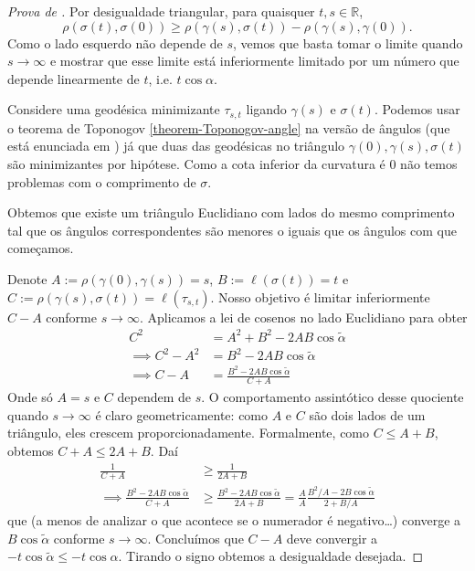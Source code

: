 \begin{proof}[Prova de \cite{Cheeger-Ebin}]
Por desigualdade triangular, para quaisquer $t,s \in \mathbb{R}$,
$$
\rho(\sigma(t),\sigma(0)) \geq
\rho(\gamma(s),\sigma(t))-\rho(\gamma(s),\gamma(0)).
$$
Como o lado esquerdo não depende de $s$, vemos que basta tomar o limite quando 
$s\to \infty$ e mostrar que esse limite está inferiormente limitado por um
número que depende linearmente de $t$, i.e. $t \cos\alpha$.

Considere uma geodésica minimizante $\tau_{s,t}$ ligando $\gamma(s)$ e
$\sigma(t)$. Podemos usar o teorema de Toponogov \ref{theorem-Toponogov-angle}
na versão de ângulos (que está enunciada em \cite{Cheeger-Ebin}) já que duas das
geodésicas no triângulo $\gamma(0),\gamma(s),\sigma(t)$ são minimizantes por
hipótese. Como a cota inferior da curvatura é 0 não temos problemas com o
comprimento de $\sigma$.

Obtemos que existe um triângulo Euclidiano com lados do mesmo comprimento tal
que os ângulos correspondentes são menores o iguais que os ângulos com que
começamos.

Denote $A:=\rho(\gamma(0),\gamma(s))=s$, $B:=\ell(\sigma(t))=t$ e
 $C:=\rho(\gamma(s),\sigma(t))=\ell(\tau_{s,t})$.
Nosso objetivo é limitar inferiormente $C-A$ conforme  $s \to \infty$.
 Aplicamos a lei de cosenos no lado Euclidiano para obter
\begin{align*}
C^2&=A^2+B^2-2AB\cos\tilde{\alpha}\\
\implies C^2-A^2&=B^2-2AB\cos\tilde{\alpha}\\
\implies C-A&=\frac{B^2-2AB\cos\tilde{\alpha}}{C+A}
\end{align*}
Onde só $A=s$ e $C$ dependem de $s$. O comportamento assintótico desse quociente
quando $s \to \infty$ é claro geometricamente: como $A$ e $C$ são dois lados de
um triângulo, eles crescem proporcionadamente. Formalmente, como $C \leq A+B$,
obtemos $C+A \leq 2A+B$. Daí
\begin{align*}
\frac{1}{C+A}&\geq \frac{1}{2A+B}\\
\implies \frac{B^2-2AB\cos \tilde{\alpha}}{C+A}&\geq
 \frac{B^2-2AB \cos \tilde{\alpha}}{2A+B}
=\frac{A}{A}\frac{B^2/A-2B\cos \tilde{\alpha}}{2+B/A}
\end{align*}
que (a menos de analizar o que acontece se o numerador é negativo…)
 converge a $B\cos \tilde{\alpha}$ conforme $s \to \infty$.
 Concluímos que $C-A$ deve
convergir a $-t\cos\tilde{\alpha}\leq-t\cos\alpha$. Tirando o signo obtemos a
desigualdade desejada.
\end{proof}

\clearpage




